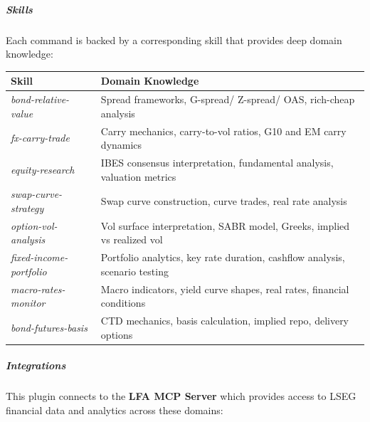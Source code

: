 \documentclass[11pt]{article}
\begin{document}
\subparagraph{Skills}\mbox{}\par

Each command is backed by a corresponding skill that provides deep domain knowledge:


\begingroup
\small
\setlength{\tabcolsep}{2pt}
\begin{longtable}{>{\RaggedRight\arraybackslash\hspace{0pt}}p{}>{\RaggedRight\arraybackslash\hspace{0pt}}p{}}
\toprule
{} \textbf{Skill} & \textbf{Domain Knowledge} \\
\midrule
{} \emph{bond-relative-value} & Spread frameworks, G-spread/ Z-spread/ OAS, rich-cheap analysis \\
{} \emph{fx-carry-trade} & Carry mechanics, carry-to-vol ratios, G10 and EM carry dynamics \\
{} \emph{equity-research} & IBES consensus interpretation, fundamental analysis, valuation metrics \\
{} \emph{swap-curve-strategy} & Swap curve construction, curve trades, real rate analysis \\
{} \emph{option-vol-analysis} & Vol surface interpretation, SABR model, Greeks, implied vs realized vol \\
{} \emph{fixed-income-portfolio} & Portfolio analytics, key rate duration, cashflow analysis, scenario testing \\
{} \emph{macro-rates-monitor} & Macro indicators, yield curve shapes, real rates, financial conditions \\
{} \emph{bond-futures-basis} & CTD mechanics, basis calculation, implied repo, delivery options \\
\bottomrule
\end{longtable}
\endgroup

\subparagraph{Integrations}\mbox{}\par

This plugin connects to the \textbf{LFA MCP Server} which provides access to LSEG financial data and analytics across these domains:
\end{document}
